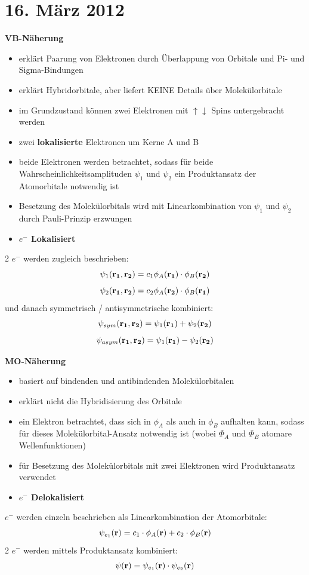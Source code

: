 \section{16. März 2012}

\label{q:41}

\textbf{VB-Näherung}
\begin{itemize}  
    \item erklärt Paarung von Elektronen durch Überlappung von Orbitale und Pi- und Sigma-Bindungen
    \item erklärt Hybridorbitale, aber liefert KEINE Details über Molekülorbitale
    \item im Grundzustand können zwei Elektronen mit $\uparrow \downarrow$ Spins untergebracht werden
    \item zwei \textbf{lokalisierte} Elektronen um Kerne A und B
    \item beide Elektronen werden betrachtet, sodass für beide Wahrscheinlichkeitsamplituden $\psi_1$ und $\psi_2$ ein Produktansatz der Atomorbitale notwendig ist %
    \item Besetzung des Molekülorbitals wird mit Linearkombination von $\psi_1$ und $\psi_2$ durch Pauli-Prinzip erzwungen %
    \item \textbf{$e^-$ Lokalisiert}
\end{itemize}
2 $e^-$ werden zugleich beschrieben:
\[\psi_1(\vb{r_1},\vb{r_2}) = c_1 \phi_A(\vb{r_1}) \cdot \phi_B(\vb{r_2})\]
\[\psi_2(\vb{r_1},\vb{r_2}) = c_2 \phi_A(\vb{r_2}) \cdot \phi_B(\vb{r_1})\]
und danach symmetrisch / antisymmetrische kombiniert: 
\[\psi_{sym}(\vb{r_1},\vb{r_2}) = \psi_1(\vb{r_1}) + \psi_2(\vb{r_2})\]
\[\psi_{asym}(\vb{r_1},\vb{r_2}) = \psi_1(\vb{r_1}) - \psi_2(\vb{r_2})\]

\noindent
\textbf{MO-Näherung}
\begin{itemize}
    \item basiert auf bindenden und antibindenden Molekülorbitalen
    \item erklärt nicht die Hybridisierung des Orbitale
    \item ein Elektron betrachtet, dass sich in $\phi_A$ als auch in $\phi_B$ aufhalten kann, sodass für dieses Molekülorbital-Ansatz notwendig ist (wobei $\Phi_A$ und $\Phi_B$ atomare Wellenfunktionen)
    \item für Besetzung des Molekülorbitals mit zwei Elektronen wird Produktansatz verwendet
    \item \textbf{$e^-$ Delokalisiert}
\end{itemize}
$e^-$ werden einzeln beschrieben als Linearkombination der Atomorbitale:
\[\psi_{e_1}(\vb{r}) = c_1 \cdot \phi_A(\vb{r}) +c_2 \cdot \phi_B(\vb{r})\]
2 $e^-$ werden mittels Produktansatz kombiniert:
\[\psi(\vb{r}) = \psi_{e_1}(\vb{r}) \cdot \psi_{e_2}(\vb{r}) \]

